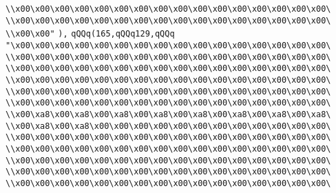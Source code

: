 \verb|\\x00\x00\x00\x00\x00\x00\x00\x00\x00\x00\x00\x00\x00\x00\x00\x00\|\newline
\verb|\\x00\x00\x00\x00\x00\x00\x00\x00\x00\x00\x00\x00\x00\x00\x00\x00\|\newline
\verb|\\x00\x00"|\newline
\verb|),|\newline
\verb|qQQq(165,qQQq129,qQQq|\newline
\verb|"\x00\x00\x00\x00\x00\x00\x00\x00\x00\x00\x00\x00\x00\x00\x00\x00\|\newline
\verb|\\x00\x00\x00\x00\x00\x00\x00\x00\x00\x00\x00\x00\x00\x00\x00\x00\|\newline
\verb|\\x00\x00\x00\x00\x00\x00\x00\x00\x00\x00\x00\x00\x00\x00\x00\x00\|\newline
\verb|\\x00\x00\x00\x00\x00\x00\x00\x00\x00\x00\x00\x00\x00\x00\x00\x00\|\newline
\verb|\\x00\x00\x00\x00\x00\x00\x00\x00\x00\x00\x00\x00\x00\x00\x00\x00\|\newline
\verb|\\x00\x00\x00\x00\x00\x00\x00\x00\x00\x00\x00\x00\x00\x00\x00\x00\|\newline
\verb|\\x00\xa8\x00\xa8\x00\xa8\x00\xa8\x00\xa8\x00\xa8\x00\xa8\x00\xa8\|\newline
\verb|\\x00\xa8\x00\xa8\x00\x00\x00\x00\x00\x00\x00\x00\x00\x00\x00\x00\|\newline
\verb|\\x00\x00\x00\x00\x00\x00\x00\x00\x00\x00\x00\x00\x00\x00\x00\x00\|\newline
\verb|\\x00\x00\x00\x00\x00\x00\x00\x00\x00\x00\x00\x00\x00\x00\x00\x00\|\newline
\verb|\\x00\x00\x00\x00\x00\x00\x00\x00\x00\x00\x00\x00\x00\x00\x00\x00\|\newline
\verb|\\x00\x00\x00\x00\x00\x00\x00\x00\x00\x00\x00\x00\x00\x00\x00\x00\|\newline
\verb|\\x00\x00\x00\x00\x00\x00\x00\x00\x00\x00\x00\x00\x00\x00\x00\x00\|\newline
